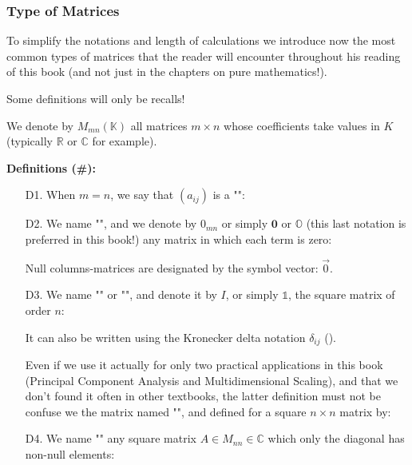 	
	\subsubsection{Type of Matrices}
	To simplify the notations and length of calculations we introduce now the most common types of matrices that the reader will encounter throughout his reading of this book (and not just in the chapters on pure mathematics!).
	
	Some definitions will only be recalls!
	
	We denote by $M_{mn}(\mathbb{K})$ all matrices $m\times n$ whose coefficients take values in $K$ (typically $\mathbb{R}$ or $\mathbb{C}$ for example).
	
	\textbf{Definitions (\#\mydef):}
	\begin{enumerate}
		\item[D1.] When $m=n$, we say that $(a_{ij})$ is a "":
			

		\item[D2.] We name "", and we denote by $0_{mn}$ or simply $\mathbf{0}$ or $\mathds{O}$ (this last notation is preferred in this book!) any matrix in which each term is zero:
			
		Null columns-matrices are designated by the symbol vector: $\vec{0}$.	
	
		\item[D3.] We name "" or "", and denote it by $I$, or simply $\mathds{1}$, the square matrix of order $n$:
		
		It can also be written using the Kronecker delta notation $\delta_{ij}$ ().
		
		\begin{tcolorbox}[title=Remark,colframe=black,arc=10pt]
		Even if we use it actually for only two practical applications in this book (Principal Component Analysis and Multidimensional Scaling), and that we don't found it often in other textbooks, the latter definition must not be confuse we the matrix named "", and defined for a square $n\times n$ matrix by:
		
		\end{tcolorbox}
		
		\item[D4.] We name "" any square matrix $A\in M_{nn}\in\mathbb{C}$ which only the diagonal has non-null elements:
		

\end{enumerate}
